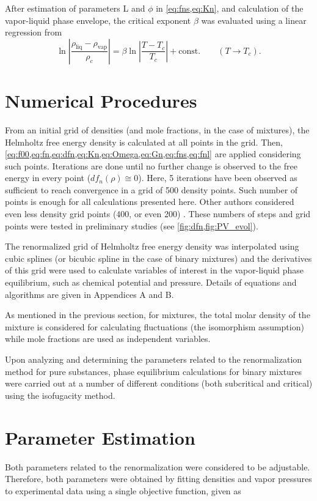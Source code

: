 \documentclass[preprint,12pt,3p]{elsarticle}
\begin{document}
    After estimation of parameters L and $\phi$ in \cref{eq:fns,eq:Kn}, and calculation of the vapor-liquid phase envelope, the critical exponent $\beta$ was evaluated using a linear regression from
\begin{equation} \label{eq:beta_law}
    \ln\left|\frac{\rho_\text{liq}-\rho_\text{vap}}{\rho_{c}}\right| = \beta \ln\left|\frac{T-T_{c}}{T_{c}}\right|+\text{const.} \qquad (T \rightarrow T_{c}).
\end{equation}

\section{Numerical Procedures}
    From an initial grid of densities (and mole fractions, in the case of mixtures), the Helmholtz free energy density is calculated at all points in the grid. Then, \cref{eq:f00,eq:fn,eq:dfn,eq:Kn,eq:Omega,eq:Gn,eq:fns,eq:fnl} are applied considering such points. Iterations are done until no further change is observed to the free energy in every point ($df_{n}(\rho) \cong 0$). Here, 5 iterations have been observed as sufficient to reach convergence in a grid of 500 density points. Such number of points is enough for all calculations presented here. Other authors considered even less density grid points (400, or even 200) \cite{cai2004thermodynamics}. These numbers of steps and grid points were tested in preliminary studies (see \cref{fig:dfn,fig:PV_evol}).

    The renormalized grid of Helmholtz free energy density was interpolated using cubic splines (or bicubic spline in the case of binary mixtures) and the derivatives of this grid were used to calculate variables of interest in the vapor-liquid phase equilibrium, such as chemical potential and pressure. Details of equations and algorithms are given in Appendices A and B.

    As mentioned in the previous section, for mixtures, the total molar density of the mixture is considered for calculating fluctuations (the isomorphism assumption) while mole fractions are used as independent variables.

    Upon analyzing and determining the parameters related to the renormalization method for pure substances, phase equilibrium calculations for binary mixtures were carried out at a number of different conditions (both subcritical and critical) using the isofugacity method.
    
\section{Parameter Estimation}
    Both parameters related to the renormalization were considered to be adjustable. Therefore, both parameters were obtained by fitting densities and vapor pressures to experimental data using a single objective function, given as
\end{document}
